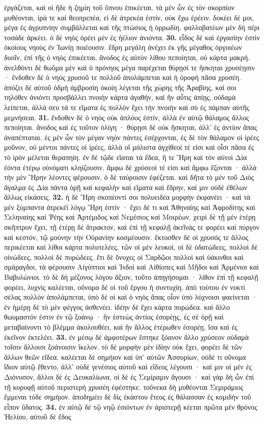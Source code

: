 \documentclass[a4paper, 11pt, oneside, polutonikogreek, german]{article}
\begin{document}
ἐργάζεται, καί οἱ ἥδε ἡ ζημίη τοῦ ὕπνου ἐπικέεται. τὰ μὲν ὦν ἐς τὸν σκορπίον μυθέονται, ἱρά τε καὶ θεοπρεπέα, εἰ δὲ ἀτρεκέα ἐστίν, οὐκ ἔχω ἐρέειν. δοκέει δέ μοι, μέγα ἐς ἀγρυπνίην συμβάλλεται καὶ τῆς πτώσιος ἡ ὀρρωδίη. φαλλοβατέων μὲν δὴ πέρι τοσάδε ἀρκέει. ὁ δὲ νηὸς ὁρέει μὲν ἐς ἠέλιον ἀνιόντα. \textbf{30.} εἶδος δὲ καὶ ἐργασίην ἐστὶν ὁκοίους νηοὺς ἐν Ἰωνίῃ ποιέουσιν. ἕδρη μεγάλη ἀνέχει ἐκ γῆς μέγαθος ὀργυιέων δυοῖν, ἐπὶ τῆς ὁ νηὸς ἐπικέεται. ἄνοδος ἐς αὐτὸν λίθου πεποίηται, οὐ κάρτα μακρή. ἀνελθόντι δὲ θωῦμα μὲν καὶ ὁ πρόνηος μέγα παρέχεται θύρῃσί τε ἤσκηται χρυσέῃσιν · ἔνδοθεν δὲ ὁ νηὸς χρυσοῦ τε πολλοῦ ἀπολάμπεται καὶ ἡ ὀροφὴ πᾶσα χρυσέη. ἀπόζει δὲ αὐτοῦ ὀδμὴ ἀμβροσίη ὁκοίη λέγεται τῆς χώρης τῆς Ἀραβίης, καί σοι τηλόθεν ἀνιόντι προσβάλλει πνοιὴν κάρτα ἀγαθήν, καὶ ἢν αὖτις ἀπίῃς, οὐδαμὰ λείπεται, ἀλλά σευ τά τε εἵματα ἐς πολλὸν ἔχει τὴν πνοιὴν καὶ σὺ ἐς πάμπαν αὐτῆς μεμνήσεαι. \textbf{31.} ἔνδοθεν δὲ ὁ νηὸς οὐκ ἁπλόος ἐστίν, ἀλλὰ ἐν αὐτῷ θάλαμος ἄλλος πεποίηται. ἄνοδος καὶ ἐς τοῦτον ὀλίγη · θύρῃσι δὲ οὐκ ἤσκηται, ἀλλ' ἐς ἀντίον ἅπας ἀναπέπταται. ἐς μὲν ὦν τὸν μέγαν νηὸν πάντες ἐσέρχονται, ἐς δὲ τὸν θάλαμον οἱ ἱρέες μοῦνον, οὐ μέντοι πάντες οἱ ἱρέες, ἀλλὰ οἳ μάλιστα ἀγχίθεοί τέ εἰσι καὶ οἷσι πᾶσα ἐς τὸ ἱρὸν μέλεται θεραπηίη. ἐν δὲ τῷδε εἵαται τὰ ἕδεα, ἥ τε Ἥρη καὶ τὸν αὐτοὶ Δία ἐόντα ἑτέρῳ οὐνόματι κληίζουσιν. ἄμφω δὲ χρύσεοί τέ εἰσι καὶ ἄμφω ἕζονται · ἀλλὰ τὴν μὲν Ἥρην λέοντες φέρουσιν, ὁ δὲ ταύροισιν ἐφέζεται. καὶ δῆτα τὸ μὲν τοῦ Διὸς ἄγαλμα ἐς Δία πάντα ὁρῇ καὶ κεφαλὴν καὶ εἵματα καὶ ἕδρην, καί μιν οὐδὲ ἐθέλων ἄλλως εἰκάσεις. \textbf{32.} ἡ δὲ Ἥρη σκοπέοντί σοι πολυειδέα μορφὴν ἐκφανέει · καὶ τὰ μὲν ξύμπαντα ἀτρεκέϊ λόγῳ Ἥρη ἐστίν · ἔχει δέ τι καὶ Ἀθηναίης καὶ Ἀφροδίτης καὶ Σεληναίης καὶ Ῥέης καὶ Ἀρτέμιδος καὶ Νεμέσιος καὶ Μοιρέων. χειρὶ δὲ τῇ μὲν ἑτέρῃ σκῆπτρον ἔχει, τῇ ἑτέρῃ δὲ ἄτρακτον, καὶ ἐπὶ τῇ κεφαλῇ ἀκτῖνάς τε φορέει καὶ πύργον καὶ κεστόν, τῷ μούνην τὴν Οὐρανίην κοσμέουσιν. ἔκτοσθεν δέ οἱ χρυσός τε ἄλλος περικέεται καὶ λίθοι κάρτα πολυτελέες, τῶν οἱ μὲν λευκοί, οἱ δὲ ὑδατώδεες, πολλοὶ δὲ οἰνώδεες, πολλοὶ δὲ πυρώδεες. ἔτι δὲ ὄνυχες οἱ Σαρδῷοι πολλοὶ καὶ ὑάκινθοι καὶ σμάραγδοι, τὰ φέρουσιν Αἰγύπτιοι καὶ Ἰνδοὶ καὶ Αἰθίοπες καὶ Μῆδοι καὶ Ἀρμένιοι καὶ Βαβυλώνιοι. τὸ δὲ δὴ μέζονος λόγου ἄξιον, τοῦτο ἀπηγήσομαι · λίθον ἐπὶ τῇ κεφαλῇ φορέει, λυχνὶς καλέεται, οὔνομα δέ οἱ τοῦ ἔργου ἡ συντυχίη. ἀπὸ τούτου ἐν νυκτὶ σέλας πολλὸν ἀπολάμπεται, ὑπὸ δέ οἱ καὶ ὁ νηὸς ἅπας οἷον ὑπὸ λύχνοισι φαείνεται · ἐν ἡμέρῃ δὲ τὸ μὲν φέγγος ἀσθενέει. ἰδέην δὲ ἔχει κάρτα πυρώδεα. καὶ ἄλλο θωυμαστόν ἐστιν ἐν τῷ ξοάνῳ · ἢν ἑστεὼς ἀντίος ἐσορέῃς, ἐς σὲ ὁρῇ καὶ μεταβαίνοντι τὸ βλέμμα ἀκολουθέει, καὶ ἢν ἄλλος ἑτέρωθεν ἐσορέῃ, ἴσα καὶ ἐς ἐκεῖνον ἐκτελέει. \textbf{33.} ἐν μέσῳ δὲ ἀμφοτέρων ἕστηκε ξόανον ἄλλο χρύσεον οὐδαμὰ τοῖσιν ἄλλοισι ξοάνοισιν ἴκελον. τὸ δὲ μορφὴν μὲν ἰδίην οὐκ ἔχει, φορέει δὲ τῶν ἄλλων θεῶν εἴδεα. καλέεται δὲ σημήιον καὶ ὑπ' αὐτῶν Ἀσσυρίων, οὐδέ τι οὔνομα ἴδιον αὐτῷ ἔθεντο, ἀλλ' οὐδὲ γενέσιος αὐτοῦ καὶ εἴδεος λέγουσι · καί μιν οἱ μὲν ἐς Διόνυσον, ἄλλοι δὲ ἐς Δευκαλίωνα, οἱ δὲ ἐς Σεμίραμιν ἄγουσι · καὶ γὰρ δὴ ὦν ἐπὶ τῇ κορυφῇ αὐτοῦ περιστερὴ χρυσέη ἐφέστηκε. τοὔνεκα δὴ μυθέονται Σεμιράμιος ἔμμεναι τόδε σημήιον. ἀποδημέει δὲ δὶς ἑκάστου ἔτεος ἐς θάλασσαν ἐς κομιδὴν τοῦ εἶπον ὕδατος. \textbf{34.} ἐν αὐτῷ δὲ τῷ νηῷ ἐσιόντων ἐν ἀριστερῇ κέεται πρῶτα μὲν θρόνος Ἠελίου, αὐτοῦ δὲ ἕδος 
\end{document}
